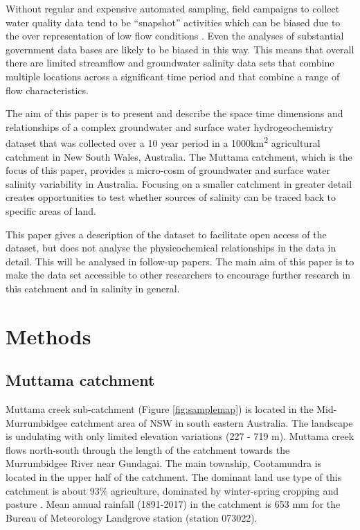 \documentclass[, manuscript]{copernicus}
\begin{document}
Without regular and expensive automated sampling, field campaigns to
collect water quality data tend to be ``snapshot'' activities
\citep{Grayson1997, Breuer2015, Lyon2008, Cartwright2010, Lintern2018}
which can be biased due to the over representation of low flow
conditions \citep{Lessels2020}. Even the analyses of substantial
government data bases \citep{Lintern2018} are likely to be biased in
this way. This means that overall there are limited streamflow and
groundwater salinity data sets that combine multiple locations across a
significant time period and that combine a range of flow
characteristics.

The aim of this paper is to present and describe the space time
dimensions and relationships of a complex groundwater and surface water
hydrogeochemistry dataset that was collected over a 10 year period in a
1000km\textsuperscript{2} agricultural catchment in New South Wales,
Australia. The Muttama catchment, which is the focus of this paper,
provides a micro-cosm of groundwater and surface water salinity
variability in Australia. Focusing on a smaller catchment in greater
detail creates opportunities to test whether sources of salinity can be
traced back to specific areas of land.

This paper gives a description of the dataset to facilitate open access
of the dataset, but does not analyse the physicochemical relationships
in the data in detail. This will be analysed in follow-up papers. The
main aim of this paper is to make the data set accessible to other
researchers to encourage further research in this catchment and in
salinity in general.

\section{Methods}

\subsection{Muttama catchment}

Muttama creek sub-catchment (Figure \ref{fig:samplemap}) is located in
the Mid-Murrumbidgee catchment area of NSW in south eastern Australia.
The landscape is undulating with only limited elevation variations (227
- 719 m). Muttama creek flows north-south through the length of the
catchment towards the Murrumbidgee River near Gundagai. The main
township, Cootamundra is located in the upper half of the catchment. The
dominant land use type of this catchment is about 93\% agriculture,
dominated by winter-spring cropping and pasture . Mean annual rainfall
(1891-2017) in the catchment is 653 mm for the Bureau of Meteorology
Landgrove station (station 073022).
\end{document}
